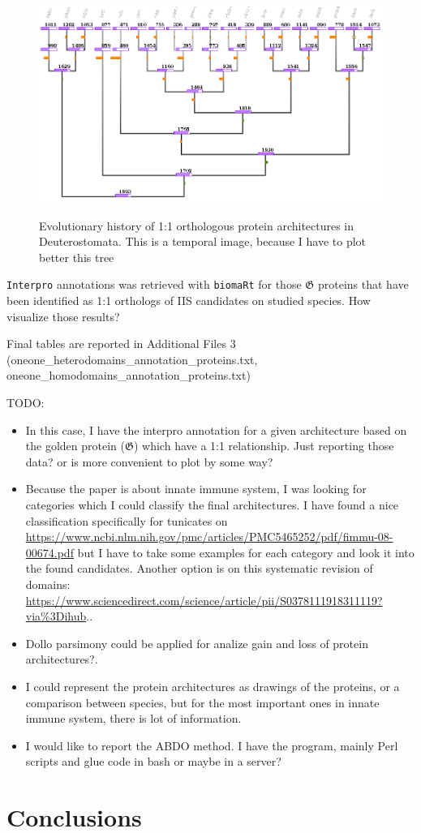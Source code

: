 \documentclass[11pt]{article}
\newcommand{\TODO}[1]{\begingroup\color{red}#1\endgroup}
\begin{document}
\begin{figure}[ht!]
\centering 
\includegraphics[scale=0.63]{figures/oneoneDollo} \\
\caption{Evolutionary history of 1:1 orthologous protein architectures in 
Deuterostomata. \TODO{This is a temporal image, because I have to plot better this tree}}\label{fig:dollooneone}
\end{figure}

\texttt{Interpro} annotations was retrieved with \texttt{biomaRt} for 
those $\boldsymbol{\mathfrak{G}}$ proteins that have been identified
as 1:1 orthologs of IIS candidates on studied species.
\TODO{How visualize those results?}

\TODO{Final tables are reported in Additional Files 3 
(oneone\_heterodomains\_annotation\_proteins.txt, 
oneone\_homodomains\_annotation\_proteins.txt)}

\TODO{TODO:}
\begin{itemize}
\item \TODO{In this case, I have the interpro annotation for a given architecture based
on the golden protein ($\boldsymbol{\mathfrak{G}}$) which have a 1:1 relationship. Just
reporting those data? or is more convenient to plot by some way?}
\item \TODO{Because the paper is about innate immune system, I was looking for 
categories which I could classify the final architectures. I have found a nice classification
specifically for tunicates on \url{https://www.ncbi.nlm.nih.gov/pmc/articles/PMC5465252/pdf/fimmu-08-00674.pdf} but I have to take some examples for each category and look it into
the found candidates. Another option is on this systematic revision of domains: \url{https://www.sciencedirect.com/science/article/pii/S0378111918311119?via\%3Dihub}.}.
\item \TODO{Dollo parsimony could be applied for analize gain and loss of protein architectures?.}
\item \TODO{I could represent the protein architectures as drawings of the proteins, or a comparison between species, but for the most important ones in innate immune system, there is lot of information.}
\item \TODO{I would like to report the ABDO method. I have the program, mainly Perl scripts and glue code in bash or maybe in a server?}
\end{itemize}

\section*{Conclusions}


\end{document}
